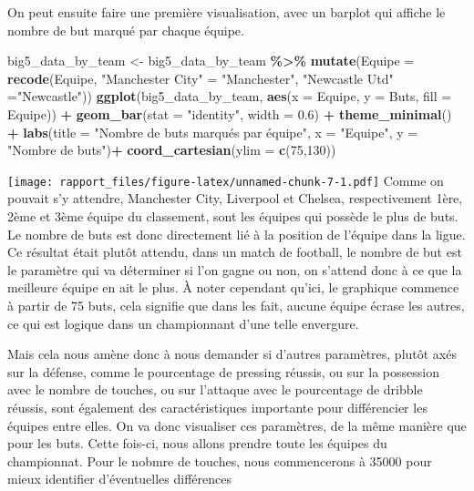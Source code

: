 \documentclass[
]{article}
\newenvironment{Shaded}{\begin{snugshade}}{\end{snugshade}}
\newcommand{\AttributeTok}[1]{\textcolor[rgb]{0.13,0.29,0.53}{#1}}
\newcommand{\DecValTok}[1]{\textcolor[rgb]{0.00,0.00,0.81}{#1}}
\newcommand{\FloatTok}[1]{\textcolor[rgb]{0.00,0.00,0.81}{#1}}
\newcommand{\FunctionTok}[1]{\textcolor[rgb]{0.13,0.29,0.53}{\textbf{#1}}}
\newcommand{\NormalTok}[1]{#1}
\newcommand{\OtherTok}[1]{\textcolor[rgb]{0.56,0.35,0.01}{#1}}
\newcommand{\SpecialCharTok}[1]{\textcolor[rgb]{0.81,0.36,0.00}{\textbf{#1}}}
\newcommand{\StringTok}[1]{\textcolor[rgb]{0.31,0.60,0.02}{#1}}
\begin{document}
On peut ensuite faire une première visualisation, avec un barplot qui
affiche le nombre de but marqué par chaque équipe.

\begin{Shaded}
\begin{Highlighting}[]
\NormalTok{big5\_data\_by\_team }\OtherTok{\textless{}{-}}\NormalTok{ big5\_data\_by\_team }\SpecialCharTok{\%\textgreater{}\%}
  \FunctionTok{mutate}\NormalTok{(}\AttributeTok{Equipe =} \FunctionTok{recode}\NormalTok{(Equipe, }\StringTok{"Manchester City"} \OtherTok{=} \StringTok{"Manchester"}\NormalTok{,}
                                   \StringTok{"Newcastle Utd"} \OtherTok{=}\StringTok{"Newcastle"}\NormalTok{))}
\FunctionTok{ggplot}\NormalTok{(big5\_data\_by\_team, }\FunctionTok{aes}\NormalTok{(}\AttributeTok{x =}\NormalTok{ Equipe, }\AttributeTok{y =}\NormalTok{ Buts, }\AttributeTok{fill =}\NormalTok{ Equipe)) }\SpecialCharTok{+}
  \FunctionTok{geom\_bar}\NormalTok{(}\AttributeTok{stat =} \StringTok{"identity"}\NormalTok{, }\AttributeTok{width =} \FloatTok{0.6}\NormalTok{) }\SpecialCharTok{+}
  \FunctionTok{theme\_minimal}\NormalTok{() }\SpecialCharTok{+}
  \FunctionTok{labs}\NormalTok{(}\AttributeTok{title =} \StringTok{"Nombre de buts marqués par équipe"}\NormalTok{, }\AttributeTok{x =} \StringTok{"Equipe"}\NormalTok{, }\AttributeTok{y =} \StringTok{"Nombre de buts"}\NormalTok{)}\SpecialCharTok{+}
  \FunctionTok{coord\_cartesian}\NormalTok{(}\AttributeTok{ylim =} \FunctionTok{c}\NormalTok{(}\DecValTok{75}\NormalTok{,}\DecValTok{130}\NormalTok{))}
\end{Highlighting}
\end{Shaded}

\texttt{[image: rapport\_files/figure-latex/unnamed-chunk-7-1.pdf]} Comme
on pouvait s'y attendre, Manchester City, Liverpool et Chelsea,
respectivement 1ère, 2ème et 3ème équipe du classement, sont les équipes
qui possède le plus de buts. Le nombre de buts est donc directement lié
à la position de l'équipe dans la ligue. Ce résultat était plutôt
attendu, dans un match de football, le nombre de but est le paramètre
qui va déterminer si l'on gagne ou non, on s'attend donc à ce que la
meilleure équipe en ait le plus. À noter cependant qu'ici, le graphique
commence à partir de 75 buts, cela signifie que dans les fait, aucune
équipe écrase les autres, ce qui est logique dans un championnant d'une
telle envergure.

Mais cela nous amène donc à nous demander si d'autres paramètres, plutôt
axés sur la défense, comme le pourcentage de pressing réussis, ou sur la
possession avec le nombre de touches, ou sur l'attaque avec le
pourcentage de dribble réussis, sont également des caractéristiques
importante pour différencier les équipes entre elles. On va donc
visualiser ces paramètres, de la même manière que pour les buts. Cette
fois-ci, nous allons prendre toute les équipes du championnat. Pour le
nobmre de touches, nous commencerons à 35000 pour mieux identifier
d'éventuelles différences
\end{document}
